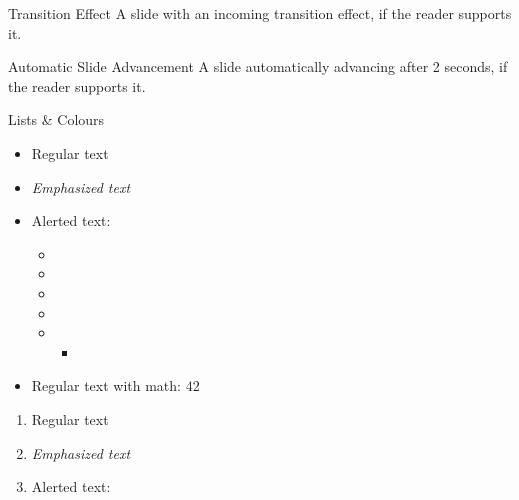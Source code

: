 \documentclass[aspectratio=169,12pt]{beamer}%
\begin{document}
    \begin{frame}{Transition Effect}
        \settransitioneffect{\transpush}
        \onecolumneven%
        {%
            A slide with an incoming transition effect, if the reader supports it.
        }%
    \end{frame}

    \begin{frame}{Automatic Slide Advancement}
        \onecolumneven%
        {%
            A slide automatically advancing after 2 seconds, if the reader supports it.
        }%
    \end{frame}



    \begin{frame}{Lists \& Colours}
        \threecolumneven%
        {%
            \begin{itemize}
                \item Regular text
                \item \emph{Emphasized text}
                \item Alerted text:
                \begin{itemize}
                    \item {}%
                    \item {}%
                    \item {}%
                    \item {}%
                    \item {}%
                    \begin{itemize}
                        \item {}
                    \end{itemize}
                \end{itemize}
                \item Regular text with math: $42$%
            \end{itemize}
        }%
        {%
            \begin{enumerate}
                \item Regular text
                \item \emph{Emphasized text}
                \item Alerted text:
                \begin{enumerate}

\end{enumerate}
\end{enumerate}}
\end{frame}
\end{document}
